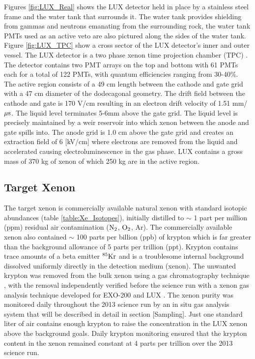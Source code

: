 Figures \ref{fig:LUX_Real} %
shows the LUX detector held in place by a stainless steel frame and the water tank that surrounds it. The water tank provides shielding from gammas and neutrons emanating from the surrounding rock, the water tank PMTs used as an active veto are also pictured along the sides of the water tank. Figure \ref{fig:LUX_TPC} show a cross sector of the LUX detector's inner and outer vessel. The LUX detector is a two phase xenon time projection chamber (TPC)  \cite{LUX_PRL}.  The detector contains two PMT arrays on the top and bottom with 61 PMTs each for a total of 122 PMTs, with quantum efficiencies ranging from 30-40\%. The active region consists of a 49 cm length between the cathode and gate grid with a 47 cm diameter of the dodecagonal geometry. The drift field between the cathode and gate is 170 V/cm resulting in an electron drift velocity of 1.51 mm/$\rm \mu s$. The liquid level terminates 5-6mm above the gate grid. The liquid level is precisely maintained by a weir reservoir into which xenon between the anode and gate spills into. The anode grid is 1.0 cm above the gate grid and creates an extraction field of 6 [kV/cm] where electrons are removed from the liquid and accelerated causing electroluminescence in the gas phase.  LUX contains a gross mass of 370 kg of xenon of which 250 kg are in the active region.  

\subsection{Target Xenon}
The target xenon is commercially available natural xenon with standard isotopic abundances (table \ref{table:Xe_Isotopes}), initially distilled to $\sim$ 1 part per million (ppm) residual air contamination ($\rm N_2$, $\rm O_2$, Ar). The commercially available xenon also contained $\sim$ 100 parts per billion (ppb) of krypton which is far greater than the background allowance of 5 parts per trillion (ppt). Krypton contains trace amounts of a beta emitter $\rm ^{85}Kr$ and is a troublesome internal background dissolved uniformly directly in the detection medium (xenon). The unwanted krypton was removed from the bulk xenon using a gas chromatography technique \cite{lux_kr_removal}, with the removal independently verified before the science run with a xenon gas analysis technique developed for EXO-200 and LUX \cite{Kr_ppt_Dobi}. The xenon purity was monitored daily throughout the 2013 science run by an in situ gas analysis system that will be described in detail in section [Sampling]. Just one standard liter of air contains enough krypton to raise the concentration in the LUX xenon above the background goals. Daily krypton monitoring ensured that the krypton content in the xenon remained constant at 4 parts per trillion over the 2013 science run\cite{LUX_BG}.


